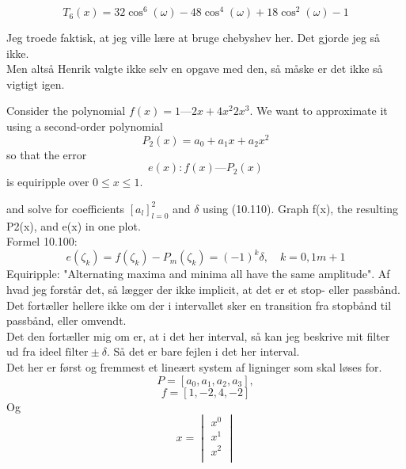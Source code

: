 \begin{Opgaver}
\begin{kapitel}
\begin{Opgave}
\begin{UnderOpgave}
                \[T_{6}{\left(x \right)} = 32 \cos^{6}{\left(\omega \right)} - 48 \cos^{4}{\left(\omega \right)} + 18 \cos^{2}{\left(\omega \right)} - 1\]
            \end{UnderOpgave}
            Jeg troede faktisk, at jeg ville lære at bruge chebyshev her. Det gjorde jeg så ikke. \\
            Men altså Henrik valgte ikke selv en opgave med den, så måske er det ikke så vigtigt igen. 

        \end{Opgave}
        \begin{Opgave}
            Consider the polynomial $f(x) = 1—2x+4x^2 2x^3$. 
            We want to approximate it using a second-order polynomial 
            \[P_2(x) = a_0 +a_1x+a_2x^2\]
            so that the error 
            \[e(x) \colon f(x) — P_2(x)\]
            is equiripple over $0\leq x \leq 1$.
            \begin{UnderOpgave}[Choose an initial set of m + 2 = 4 nodes \text{$\left[\zeta_{k}\right]_{k=0}^{3}$} as 0, 1/3, 2/3, and 1, ...]
                and solve for coefficients $[a_l]_{l = 0}^2$ and $\delta$ using (10.110). 
                Graph f(x), the resulting P2(x), and e(x) in one plot.\\
                Formel 10.100: 
                \[e(\zeta_{k})=f(\zeta_{k})-P_{m}(\zeta_{k})=(-1)^{k}\delta,\quad k=0,1 m+1\]
                Equiripple: "Alternating maxima and minima all have the same amplitude". 
                Af hvad jeg forstår det, så lægger der ikke implicit, at det er et stop- eller passbånd.\\
                Det fortæller hellere ikke om der i intervallet sker en transition fra stopbånd til passbånd, eller omvendt.\\
                Det den fortæller mig om er, at i det her interval, så kan jeg beskrive mit filter ud fra $\text{ideel filter} \pm \delta$. 
                Så det er bare fejlen i det her interval. \\
                Det her er først og fremmest et lineært system af ligninger som skal løses for. 
                \[P = [a_0, a_1, a_2, a_3],\]
                \[f = [1, -2, 4, -2]\]
                Og
                \[x = 
                \begin{vmatrix}
                    x^0 \\
                    x^1 \\
                    x^2 \\

\end{vmatrix}\]
\end{UnderOpgave}
\end{Opgave}
\end{kapitel}
\end{Opgaver}
